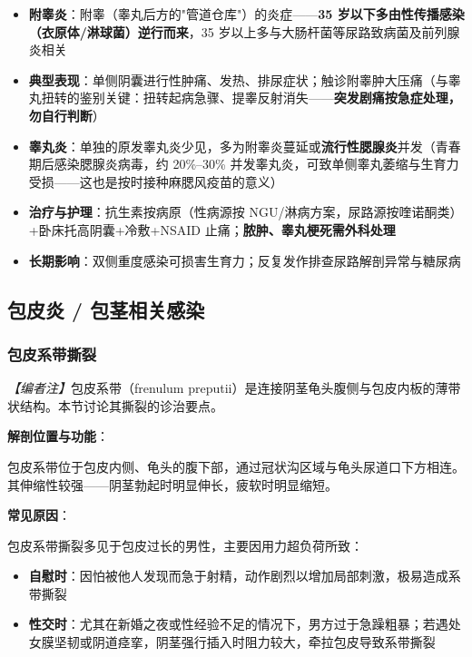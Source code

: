 \begin{itemize}
	\item \textbf{附睾炎}：附睾（睾丸后方的"管道仓库"）的炎症——\textbf{35 岁以下多由性传播感染（衣原体/淋球菌）逆行而来}，35 岁以上多与大肠杆菌等尿路致病菌及前列腺炎相关
	\item \textbf{典型表现}：单侧阴囊进行性肿痛、发热、排尿症状；触诊附睾肿大压痛（与睾丸扭转的鉴别关键：扭转起病急骤、提睾反射消失——\textbf{突发剧痛按急症处理，勿自行判断}）
	\item \textbf{睾丸炎}：单独的原发睾丸炎少见，多为附睾炎蔓延或\textbf{流行性腮腺炎}并发（青春期后感染腮腺炎病毒，约 20\%--30\% 并发睾丸炎，可致单侧睾丸萎缩与生育力受损——这也是按时接种麻腮风疫苗的意义）
	\item \textbf{治疗与护理}：抗生素按病原（性病源按 NGU/淋病方案，尿路源按喹诺酮类）+卧床托高阴囊+冷敷+NSAID 止痛；\textbf{脓肿、睾丸梗死需外科处理}
	\item \textbf{长期影响}：双侧重度感染可损害生育力；反复发作排查尿路解剖异常与糖尿病
\end{itemize}

\subsection{包皮炎 / 包茎相关感染}

\subsubsection{包皮系带撕裂}

\noindent\textit{【编者注】}包皮系带（frenulum preputii）是连接阴茎龟头腹侧与包皮内板的薄带状结构。本节讨论其撕裂的诊治要点。

\vspace{0.5em}
\noindent\textbf{解剖位置与功能}：

包皮系带位于包皮内侧、龟头的腹下部，通过冠状沟区域与龟头尿道口下方相连。其伸缩性较强——阴茎勃起时明显伸长，疲软时明显缩短。

\vspace{0.5em}
\noindent\textbf{常见原因}：

包皮系带撕裂多见于包皮过长的男性，主要因用力超负荷所致：
\begin{itemize}
	\item \textbf{自慰时}：因怕被他人发现而急于射精，动作剧烈以增加局部刺激，极易造成系带撕裂
	\item \textbf{性交时}：尤其在新婚之夜或性经验不足的情况下，男方过于急躁粗暴；若遇处女膜坚韧或阴道痉挛，阴茎强行插入时阻力较大，牵拉包皮导致系带撕裂
\end{itemize}

